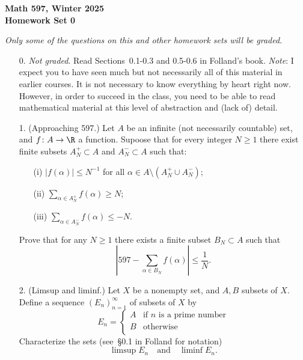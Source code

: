 \documentclass[11pt]{article}
\begin{document}
\thispagestyle{empty}




\begin{center}
\textbf{%
Math 597, Winter 2025\\
Homework Set 0\\
}
\end{center}
\begin{center}
  \textit{Only some of the questions on this and other homework sets will be graded}.
\end{center}

  \begin{enumerate}
  \item[0.]
    \emph{Not graded}.
    Read Sections~0.1-0.3 and 0.5-0.6 in Folland's book. \textit{Note}: I expect you to have seen much but not necessarily all of this material in earlier courses. It is not necessary to know everything by heart right now. However, in order to succeed in the class, you need to be able to read mathematical material at this level of abstraction and (lack of) detail.

  \item[1.]
    (Approaching 597.)
    Let $A$ be an infinite (not necessarily countable) set, and
    $f\colon A\to\R$ a function. Supoose that for every integer $N\ge
    1$ there exist finite subsets $A^+_N\subset A$ and $A^-_N\subset A$ such that:
    \begin{itemize}
    \item[(i)]
      $|f(\alpha)|\le N^{-1}$ for all $\alpha\in A\setminus (A^+_N\cup A^-_N)$;
    \item[(ii)] 
      $\sum_{\alpha\in A^+_N}f(\alpha)\ge N$;
    \item[(iii)] 
      $\sum_{\alpha\in A^-_N}f(\alpha)\le-N$. 
    \end{itemize}
    Prove that for any $N\ge 1$ there exists a finite subset $B_N\subset A$ such that
    \[
      \left|597-\sum_{\alpha\in B_N}f(\alpha)\right|\le\frac1N.
    \]
    
  \item[2.]
    (Limsup and liminf.)
    Let $X$ be a nonempty set, and $A,B$ subsets of $X$. Define a sequence $(E_n)_{n=1}^\infty$ of subsets of $X$ by
    \[
      E_n=
      \begin{cases}
        A &\text{if $n$ is a prime number}\\
        B &\text{otherwise}\\
      \end{cases}
    \]
    Characterize the sets (see~\S0.1 in Folland for notation)
    \[
      \limsup E_n
      \quad\text{and}\quad
      \liminf E_n.
    \]
    

\end{enumerate}
\end{document}
